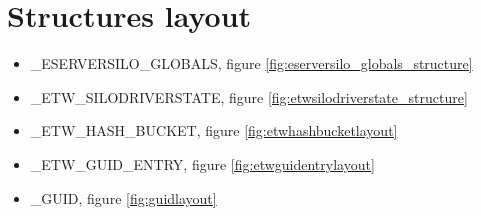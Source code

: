 \section{Structures layout}
\begin{itemize}
\item \_ESERVERSILO\_GLOBALS, figure \ref{fig:eserversilo_globals_structure}
\item \_ETW\_SILODRIVERSTATE, figure \ref{fig:etwsilodriverstate_structure}
\item \_ETW\_HASH\_BUCKET, figure \ref{fig:etwhashbucketlayout}
\item \_ETW\_GUID\_ENTRY, figure \ref{fig:etwguidentrylayout}
\item \_GUID, figure \ref{fig:guidlayout}  
\end{itemize}
